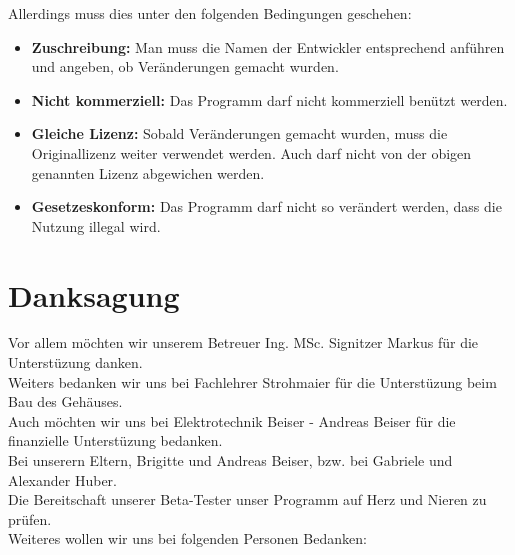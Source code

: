 \documentclass[12pt,a4paper]{article}
\begin{document}
{Allerdings muss dies unter den folgenden Bedingungen geschehen:
\begin{itemize}
	\item{\textbf{Zuschreibung:} Man muss die Namen der Entwickler entsprechend anführen und angeben, ob Veränderungen gemacht wurden.}
	\item{\textbf{Nicht kommerziell:} Das Programm darf nicht kommerziell benützt werden.}
	\item{\textbf{Gleiche Lizenz:} Sobald Veränderungen gemacht wurden, muss die Originallizenz weiter verwendet werden. Auch darf nicht von der obigen genannten Lizenz abgewichen werden.}
	\item{\textbf{Gesetzeskonform:} Das Programm darf nicht so verändert werden, dass die Nutzung illegal wird.}
\end{itemize}

\newpage
\section{Danksagung}
\label{SEC:THANKS}

Vor allem möchten wir unserem Betreuer Ing. MSc. Signitzer Markus für die Unterstüzung danken. \\
Weiters bedanken wir uns bei Fachlehrer Strohmaier für die Unterstüzung beim Bau des Gehäuses. \\[1ex]
Auch möchten wir uns bei Elektrotechnik Beiser - Andreas Beiser für die finanzielle Unterstüzung bedanken. \\[1ex]
Bei unserern Eltern, Brigitte und Andreas Beiser, bzw. bei Gabriele und Alexander Huber. \\
Die Bereitschaft unserer Beta-Tester unser Programm auf Herz und Nieren zu prüfen. \\
Weiteres wollen wir uns bei folgenden Personen Bedanken:


\clearpage\vfill\newpage{}

}
\end{document}
